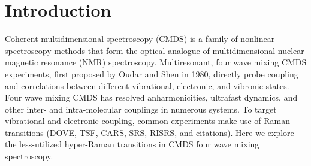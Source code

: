 \documentclass[aip, jcp, reprint, onecolumn]{revtex4-2}
\begin{document}
\maketitle

\section{Introduction}
Coherent multidimensional spectroscopy (CMDS) is a family of nonlinear spectroscopy methods that form the optical analogue of multidimensional nuclear magnetic resonance (NMR) spectroscopy.\cite{Cho2008}
Multiresonant, four wave mixing CMDS experiments, first proposed by Oudar and Shen in 1980,\cite{RN307} directly probe coupling and correlations between different vibrational, electronic, and vibronic states. \cite{RN281, RN103, Cho2008} 
Four wave mixing CMDS has resolved anharmonicities, ultrafast dynamics, and other inter- and intra-molecular couplings in numerous systems. \cite{Cho2008, Gaynor2017, Ziegler2018, Ogilvie2019, Bonn2021, RN325}
To target vibrational and electronic coupling, common experiments make use of Raman transitions (DOVE, TSF, CARS, SRS, RISRS, and citations).
Here we explore the less-utilized hyper-Raman transitions in CMDS four wave mixing spectroscopy.
\end{document}
